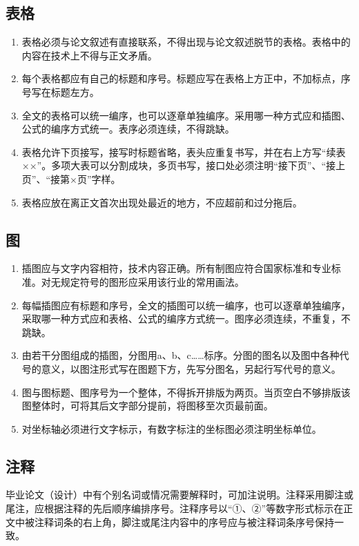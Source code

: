 \subsection{表格}

\begin{enumerate}
    \item 表格必须与论文叙述有直接联系，不得出现与论文叙述脱节的表格。表格中的内容在技术上不得与正文矛盾。
    \item 每个表格都应有自己的标题和序号。标题应写在表格上方正中，不加标点，序号写在标题左方。
    \item 全文的表格可以统一编序，也可以逐章单独编序。采用哪一种方式应和插图、公式的编序方式统一。表序必须连续，不得跳缺。
    \item 表格允许下页接写，接写时标题省略，表头应重复书写，并在右上方写“续表××”。多项大表可以分割成块，多页书写，接口处必须注明“接下页”、“接上页”、“接第×页”字样。
    \item 表格应放在离正文首次出现处最近的地方，不应超前和过分拖后。
\end{enumerate}

\subsection{图}

\begin{enumerate}
    \item 插图应与文字内容相符，技术内容正确。所有制图应符合国家标准和专业标准。对无规定符号的图形应采用该行业的常用画法。
    \item 每幅插图应有标题和序号，全文的插图可以统一编序，也可以逐章单独编序，采取哪一种方式应和表格、公式的编序方式统一。图序必须连续，不重复，不跳缺。
    \item 由若干分图组成的插图，分图用a、b、c……标序。分图的图名以及图中各种代号的意义，以图注形式写在图题下方，先写分图名，另起行写代号的意义。
    \item 图与图标题、图序号为一个整体，不得拆开排版为两页。当页空白不够排版该图整体时，可将其后文字部分提前，将图移至次页最前面。
    \item 对坐标轴必须进行文字标示，有数字标注的坐标图必须注明坐标单位。
\end{enumerate}

\subsection{注释}

毕业论文（设计）中有个别名词或情况需要解释时，可加注说明。注释采用脚注或尾注，应根据注释的先后顺序编排序号。注释序号以“①、②”等数字形式标示在正文中被注释词条的右上角，脚注或尾注内容中的序号应与被注释词条序号保持一致。

